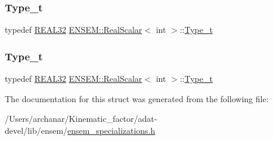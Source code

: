 \mbox{\label{structENSEM_1_1RealScalar_3_01int_01_4_af4f2f0e6cc881e70e0564b3fe00b8ff7}} 
\subsubsection{\texorpdfstring{Type\_t}{Type\_t}\hspace{0.1cm}{\footnotesize\ttfamily [2/3]}}
{\footnotesize\ttfamily typedef \mbox{\hyperlink{namespaceENSEM_a7540d01191172323e9073283d772576d}{R\+E\+A\+L32}} \mbox{\hyperlink{structENSEM_1_1RealScalar}{E\+N\+S\+E\+M\+::\+Real\+Scalar}}$<$ int $>$\+::\mbox{\hyperlink{structENSEM_1_1RealScalar_3_01int_01_4_af4f2f0e6cc881e70e0564b3fe00b8ff7}{Type\+\_\+t}}}

\mbox{\label{structENSEM_1_1RealScalar_3_01int_01_4_af4f2f0e6cc881e70e0564b3fe00b8ff7}} 
\subsubsection{\texorpdfstring{Type\_t}{Type\_t}\hspace{0.1cm}{\footnotesize\ttfamily [3/3]}}
{\footnotesize\ttfamily typedef \mbox{\hyperlink{namespaceENSEM_a7540d01191172323e9073283d772576d}{R\+E\+A\+L32}} \mbox{\hyperlink{structENSEM_1_1RealScalar}{E\+N\+S\+E\+M\+::\+Real\+Scalar}}$<$ int $>$\+::\mbox{\hyperlink{structENSEM_1_1RealScalar_3_01int_01_4_af4f2f0e6cc881e70e0564b3fe00b8ff7}{Type\+\_\+t}}}



The documentation for this struct was generated from the following file\+:\begin{DoxyCompactItemize}
\item 
/\+Users/archanar/\+Kinematic\+\_\+factor/adat-\/devel/lib/ensem/\mbox{\hyperlink{adat-devel_2lib_2ensem_2ensem__specializations_8h}{ensem\+\_\+specializations.\+h}}\end{DoxyCompactItemize}
